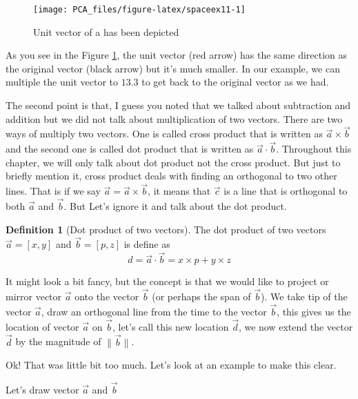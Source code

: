 \documentclass[
]{book}
\theoremstyle{definition}
\newtheorem{definition}{Definition}[chapter]
\theoremstyle{definition}
\theoremstyle{definition}
\theoremstyle{remark}
\begin{document}
\begin{figure}

{\centering \texttt{[image: PCA\_files/figure-latex/spaceex11-1]} 

}

\caption{Unit vector of a has been depicted}\label{fig:spaceex11}
\end{figure}

As you see in the Figure \ref{fig:spaceex11}, the unit vector (red arrow) has the same direction as the original vector (black arrow) but it's much smaller. In our example, we can multiple the unit vector to \(13.3\) to get back to the original vector as we had.

The second point is that, I guess you noted that we talked about subtraction and addition but we did not talk about multiplication of two vectors. There are two ways of multiply two vectors. One is called cross product that is written as \(\vec{a} \times \vec{b}\) and the second one is called dot product that is written as \(\vec{a}\cdot\vec{b}\). Throughout this chapter, we will only talk about dot product not the cross product. But just to briefly mention it, cross product deals with finding an orthogonal to two other lines. That is if we say \(\vec{a}=\vec{a} \times \vec{b}\), it means that \(\vec{c}\) is a line that is orthogonal to both \(\vec{a}\) and \(\vec{b}\). But Let's ignore it and talk about the dot product.

\begin{definition}[Dot product of two vectors]
\protect\hypertarget{def:dotprod}{}{\label{def:dotprod} \iffalse (Dot product of two vectors) \fi{} }
The dot product of two vectors \(\vec{a}=[x,y]\) and \(\vec{b}=[p,z]\) is define as
\[d=\vec{a}\cdot\vec{b}=x \times p+y \times z\]

It might look a bit fancy, but the concept is that we would like to project or mirror vector \(\vec{a}\) onto the vector \(\vec{b}\) (or perhaps the span of \(\vec{b}\)). We take tip of the vector \(\vec{a}\), draw an orthogonal line from the time to the vector \(\vec{b}\), this gives us the location of vector \(\vec{a}\) on \(\vec{b}\), let's call this new location \(\vec{d}\), we now extend the vector \(\vec{d}\) by the magnitude of \(\|\vec{b}\|\).
\end{definition}

Ok! That was little bit too much. Let's look at an example to make this clear.

Let's draw vector \(\vec{a}\) and \(\vec{b}\)
\end{document}
